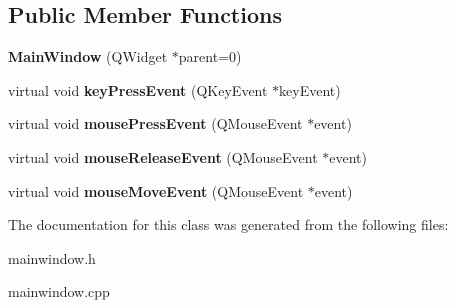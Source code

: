 \subsection*{Public Member Functions}
\begin{DoxyCompactItemize}
\item 
\hypertarget{classMainWindow_a8b244be8b7b7db1b08de2a2acb9409db}{{\bfseries Main\-Window} (Q\-Widget $\ast$parent=0)}\label{classMainWindow_a8b244be8b7b7db1b08de2a2acb9409db}

\item 
\hypertarget{classMainWindow_ab85c711e421fb0f0dfec5e4e68cbfa51}{virtual void {\bfseries key\-Press\-Event} (Q\-Key\-Event $\ast$key\-Event)}\label{classMainWindow_ab85c711e421fb0f0dfec5e4e68cbfa51}

\item 
\hypertarget{classMainWindow_a2b5463ae209a03d1680b39c950dac8be}{virtual void {\bfseries mouse\-Press\-Event} (Q\-Mouse\-Event $\ast$event)}\label{classMainWindow_a2b5463ae209a03d1680b39c950dac8be}

\item 
\hypertarget{classMainWindow_a32bbb036a55856e49c31a5348f937b53}{virtual void {\bfseries mouse\-Release\-Event} (Q\-Mouse\-Event $\ast$event)}\label{classMainWindow_a32bbb036a55856e49c31a5348f937b53}

\item 
\hypertarget{classMainWindow_a2cf42454562815dd44c716e78d515697}{virtual void {\bfseries mouse\-Move\-Event} (Q\-Mouse\-Event $\ast$event)}\label{classMainWindow_a2cf42454562815dd44c716e78d515697}

\end{DoxyCompactItemize}


The documentation for this class was generated from the following files\-:\begin{DoxyCompactItemize}
\item 
mainwindow.\-h\item 
mainwindow.\-cpp\end{DoxyCompactItemize}
